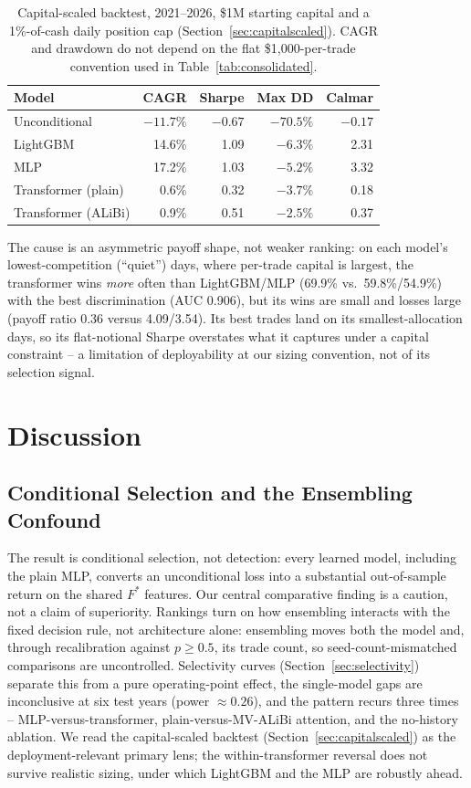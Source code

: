 \documentclass[sigconf,review,anonymous]{acmart}
\begin{document}
\begin{table}[t]
\centering
\footnotesize
\begin{tabular}{lrrrr}
\toprule
Model & CAGR & Sharpe & Max DD & Calmar \\
\midrule
Unconditional & $-11.7\%$ & $-0.67$ & $-70.5\%$ & $-0.17$ \\
LightGBM & 14.6\% & 1.09 & $-6.3\%$ & 2.31 \\
MLP & 17.2\% & 1.03 & $-5.2\%$ & 3.32 \\
Transformer (plain) & 0.6\% & 0.32 & $-3.7\%$ & 0.18 \\
Transformer (ALiBi) & 0.9\% & 0.51 & $-2.5\%$ & 0.37 \\
\bottomrule
\end{tabular}
\caption{Capital-scaled backtest, 2021--2026, \$1M starting capital and a 1\%-of-cash daily position cap (Section~\ref{sec:capitalscaled}). CAGR and drawdown do not depend on the flat \$1,000-per-trade convention used in Table~\ref{tab:consolidated}.}
\label{tab:capitalscaled}
\end{table}

The cause is an asymmetric payoff shape, not weaker ranking: on each model's lowest-competition (``quiet'') days, where per-trade capital is largest, the transformer wins \emph{more} often than LightGBM/MLP (69.9\% vs.\ 59.8\%/54.9\%) with the best discrimination (AUC 0.906), but its wins are small and losses large (payoff ratio 0.36 versus 4.09/3.54). Its best trades land on its smallest-allocation days, so its flat-notional Sharpe overstates what it captures under a capital constraint -- a limitation of deployability at our sizing convention, not of its selection signal.

\section{Discussion}
\label{sec:discussion}

\subsection{Conditional Selection and the Ensembling Confound}
\label{sec:ensembling-discussion}
The result is conditional selection, not detection: every learned model, including the plain MLP, converts an unconditional loss into a substantial out-of-sample return on the shared $F^{\ast}$ features. Our central comparative finding is a caution, not a claim of superiority. Rankings turn on how ensembling interacts with the fixed decision rule, not architecture alone: ensembling moves both the model and, through recalibration against $p\ge0.5$, its trade count, so seed-count-mismatched comparisons are uncontrolled. Selectivity curves (Section~\ref{sec:selectivity}) separate this from a pure operating-point effect, the single-model gaps are inconclusive at six test years (power $\approx0.26$), and the pattern recurs three times -- MLP-versus-transformer, plain-versus-MV-ALiBi attention, and the no-history ablation. We read the capital-scaled backtest (Section~\ref{sec:capitalscaled}) as the deployment-relevant primary lens; the within-transformer reversal does not survive realistic sizing, under which LightGBM and the MLP are robustly ahead.
\end{document}
